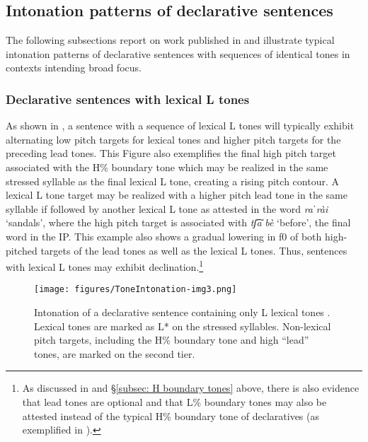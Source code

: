 \subsection{Intonation patterns of declarative sentences}
\label{subsec: F0 in intonation}

The following subsections report on work published in \citet{kubuzono2020raramuri} and illustrate typical intonation patterns of declarative sentences with sequences of identical tones in contexts intending broad focus.

\subsubsection{Declarative sentences with lexical L tones}
\label{subsubsec: intonation declaratives L}

As shown in , a sentence with a sequence of lexical L tones will typically exhibit alternating low pitch targets for lexical tones and higher pitch targets for the preceding lead tones. This Figure also exemplifies the final high pitch target associated with the H\% boundary tone which may be realized in the same stressed syllable as the final lexical L tone, creating a rising pitch contour. A lexical L tone target may be realized with a higher pitch lead tone in the same syllable if followed by another lexical L tone as attested in the word \textit{raˈrài} ‘sandals’, where the high pitch target is associated with \textit{tʃ͡aˈbè} `before', the final word in the IP. This example also shows a gradual lowering in f0 of both high-pitched targets of the lead tones as well as the lexical L tones. Thus, sentences with lexical L tones may exhibit declination.\footnote{As discussed in \citet{kubuzono2020raramuri} and §\ref{subsec: H boundary tones} above, there is also evidence that lead tones are optional and that L\% boundary tones may also be attested instead of the typical H\% boundary tone of declaratives (as exemplified in ).}

\begin{figure}
\texttt{[image: figures/ToneIntonation-img3.png]}
\caption{
\label{fig: declaratives with lexical L tones}
Intonation of a declarative sentence containing only L lexical tones \parencite{kubuzono2020raramuri}. Lexical tones are marked as L* on the stressed syllables. Non-lexical pitch targets, including the H\% boundary tone and high “lead” tones, are marked on the second tier.}
\end{figure}

